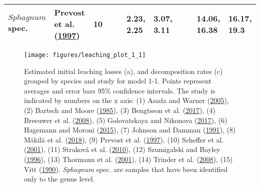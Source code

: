 \documentclass[
  12pt,
]{article}
\begin{document}
\begin{table}[H]
{\begin{tabular}[t]{llrllllllll}
\multirow[t]{-2}{*}{\raggedright\arraybackslash $Sphagnum$ spec.} & Prevost et al. (\protect\hyperlink{ref-Prevost.1997}{1997}) & 10 &  &  & 2.23, 2.25 & 3.07, 3.11 &  &  & 14.06, 16.38 & 16.17, 19.3\\
\bottomrule
\end{tabular}}
\end{table}

\clearpage

















\begin{figure}[H]

{\centering \texttt{[image: figures/leaching\_plot\_1\_1]} 

}

\caption{Estimated initial leaching losses (a), and decomposition rates (c) grouped by species and study for model 1-1. Points represent averages and error bars 95\% confidence intervals. The study is indicated by numbers on the x axis: (1) Asada and Warner (\protect\hyperlink{ref-Asada.2005b}{2005}), (2) Bartsch and Moore (\protect\hyperlink{ref-Bartsch.1985}{1985}), (3) Bengtsson et al. (\protect\hyperlink{ref-Bengtsson.2017}{2017}), (4) Breeuwer et al. (\protect\hyperlink{ref-Breeuwer.2008}{2008}), (5) Golovatskaya and Nikonova (\protect\hyperlink{ref-Golovatskaya.2017}{2017}), (6) Hagemann and Moroni (\protect\hyperlink{ref-Hagemann.2015}{2015}), (7) Johnson and Damman (\protect\hyperlink{ref-Johnson.1991}{1991}), (8) Mäkilä et al. (\protect\hyperlink{ref-Makila.2018}{2018}), (9) Prevost et al. (\protect\hyperlink{ref-Prevost.1997}{1997}), (10) Scheffer et al. (\protect\hyperlink{ref-Scheffer.2001}{2001}), (11) Straková et al. (\protect\hyperlink{ref-Strakova.2010}{2010}), (12) Szumigalski and Bayley (\protect\hyperlink{ref-Szumigalski.1996}{1996}), (13) Thormann et al. (\protect\hyperlink{ref-Thormann.2001}{2001}), (14) Trinder et al. (\protect\hyperlink{ref-Trinder.2008}{2008}), (15) Vitt (\protect\hyperlink{ref-Vitt.1990}{1990}). \emph{Sphagnum} spec. are samples that have been identified only to the genus level.}\label{fig:sup-out-mm-p5-1-1}
\end{figure}
\end{document}
